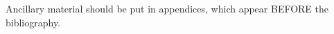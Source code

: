 \documentclass[11pt,proposal]{ucthesis}
\begin{document}
Ancillary material should be put in appendices, which appear BEFORE the
bibliography. 


\nocite{*}

\def\baselinestretch{1.0}\large\normalsize



\end{document}
